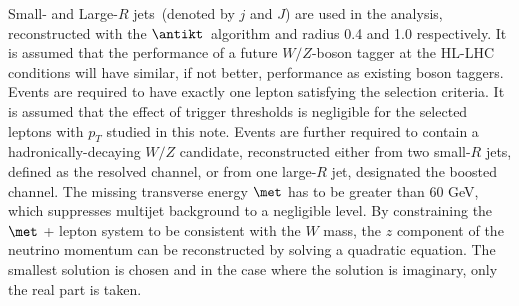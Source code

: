 Small- and Large-$R$ jets~(denoted by $j$ and $J$) are used in the analysis, reconstructed 
with the $\antikt$~algorithm and radius 0.4 and 1.0 respectively. It is assumed that the 
performance of a future $W/Z$-boson tagger at the HL-LHC conditions will have similar, if not better, 
performance as existing boson taggers. 
Events are required to have exactly one lepton satisfying the selection criteria.
It is assumed that the effect of trigger thresholds is negligible for the selected leptons with $p_{T}$ studied in this note.
Events are further required to contain a hadronically-decaying $W/Z$ candidate, reconstructed either from two small-$R$ 
jets, defined as the resolved channel, or from one large-$R$ jet, designated the boosted channel.
The missing transverse energy $\met$ has to be greater than 60 GeV,
which suppresses multijet background to a negligible level.
By constraining the $\met$ + lepton system to be consistent with the $W$ mass, the $z$ component of the neutrino  momentum
can be reconstructed by solving a quadratic equation. The smallest solution is chosen and in the case where the 
solution is imaginary, only the real part is taken. \\

